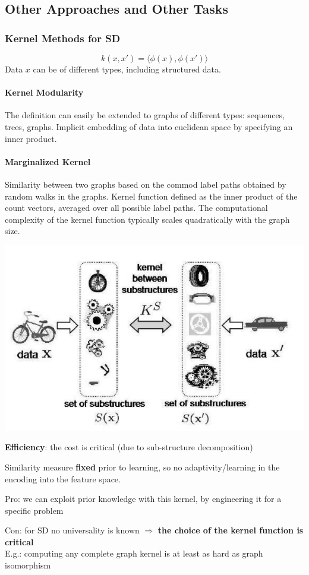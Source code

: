 \documentclass[10pt]{report}
\begin{document}
\subsection{Other Approaches and Other Tasks}
\subsubsection{Kernel Methods for SD}
$$k(x,x')=\langle\phi(x),\phi(x')\rangle$$
Data $x$ can be of different types, including structured data.
\paragraph{Kernel Modularity} The definition can easily be extended to graphs of different types: sequences, trees, graphs. Implicit embedding of data into euclidean space by specifying an inner product.
\paragraph{Marginalized Kernel} Similarity between two graphs based on the commod label paths obtained by random walks in the graphs. Kernel function defined as the inner product of the count vectors, averaged over all possible label paths. The computational complexity of the kernel function typically scales quadratically with the graph size.
\begin{center}
	\includegraphics[scale=0.5]{49.png}
\end{center}
\begin{list}{}{}
	\item \textbf{Efficiency}: the cost is critical (due to sub-structure decomposition)
	\item Similarity measure \textbf{fixed} prior to learning, so no adaptivity/learning in the encoding into the feature space.\begin{list}{}{}
		\item Pro: we can exploit prior knowledge with this kernel, by engineering it for a specific problem
		\item Con: for SD no universality is known $\Rightarrow$ \textbf{the choice of the kernel function is critical}\\
		E.g.: computing any complete graph kernel is at least as hard as graph isomorphism
	\end{list}
\end{list}
\end{document}
